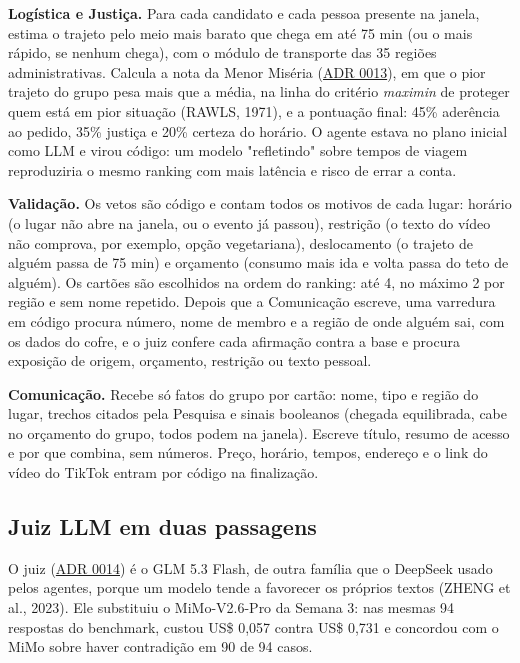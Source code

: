 \documentclass[12pt,a4paper]{article}
\begin{document}
\textbf{Logística e Justiça.} Para cada candidato e cada pessoa presente na janela, estima o trajeto pelo meio mais barato que chega em até 75 min (ou o mais rápido, se nenhum chega), com o módulo de transporte das 35 regiões administrativas. Calcula a nota da Menor Miséria (\href{https://github.com/Residencia-IA-Challenge-2-Grupo-7/residencia-ia-g7-challenge2/blob/main/docs/decisoes/0013-deslocamento-e-menor-miseria.md}{ADR 0013}), em que o pior trajeto do grupo pesa mais que a média, na linha do critério \textit{maximin} de proteger quem está em pior situação (RAWLS, 1971), e a pontuação final: 45\% aderência ao pedido, 35\% justiça e 20\% certeza do horário. O agente estava no plano inicial como LLM e virou código: um modelo "refletindo" sobre tempos de viagem reproduziria o mesmo ranking com mais latência e risco de errar a conta.

\textbf{Validação.} Os vetos são código e contam todos os motivos de cada lugar: horário (o lugar não abre na janela, ou o evento já passou), restrição (o texto do vídeo não comprova, por exemplo, opção vegetariana), deslocamento (o trajeto de alguém passa de 75 min) e orçamento (consumo mais ida e volta passa do teto de alguém). Os cartões são escolhidos na ordem do ranking: até 4, no máximo 2 por região e sem nome repetido. Depois que a Comunicação escreve, uma varredura em código procura número, nome de membro e a região de onde alguém sai, com os dados do cofre, e o juiz confere cada afirmação contra a base e procura exposição de origem, orçamento, restrição ou texto pessoal.

\textbf{Comunicação.} Recebe só fatos do grupo por cartão: nome, tipo e região do lugar, trechos citados pela Pesquisa e sinais booleanos (chegada equilibrada, cabe no orçamento do grupo, todos podem na janela). Escreve título, resumo de acesso e por que combina, sem números. Preço, horário, tempos, endereço e o link do vídeo do TikTok entram por código na finalização.

\subsection{Juiz LLM em duas passagens}
O juiz (\href{https://github.com/Residencia-IA-Challenge-2-Grupo-7/residencia-ia-g7-challenge2/blob/main/docs/decisoes/0014-juiz-glm-5.3-flash.md}{ADR 0014}) é o GLM 5.3 Flash, de outra família que o DeepSeek usado pelos agentes, porque um modelo tende a favorecer os próprios textos (ZHENG et al., 2023). Ele substituiu o MiMo-V2.6-Pro da Semana 3: nas mesmas 94 respostas do benchmark, custou US\$ 0,057 contra US\$ 0,731 e concordou com o MiMo sobre haver contradição em 90 de 94 casos.
\end{document}
